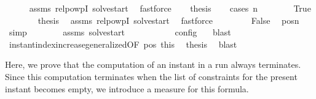 \begin{isabellebody}
\ \ \ \ \isamarkupfalse%
\ assms\ relpowp{\isacharunderscore}{}{\isacharunderscore}I\ solve{\isacharunderscore}start\ \isamarkupfalse%
\ fastforce\isanewline
\ \ \isamarkupfalse%
\ {\isacharquery}thesis\isanewline
\ \ \isamarkupfalse%
\ {\isacharparenleft}cases\ {\isacartoucheopen}n\ {\isacharequal}\ {}{\isacartoucheclose}{\isacharparenright}\isanewline
\ \ \ \ \isamarkupfalse%
\ True\isanewline
\ \ \ \ \ \ \isamarkupfalse%
\ {\isacharquery}thesis\ \isamarkupfalse%
\ assms\ relpowp{\isacharunderscore}{}{\isacharunderscore}I\ solve{\isacharunderscore}start\ \isamarkupfalse%
\ fastforce\isanewline
\ \ \isamarkupfalse%
\isanewline
\ \ \ \ \isamarkupfalse%
\ False\ \isamarkupfalse%
\ pos{\isacharcolon}{\isacartoucheopen}n\ {\isachargreater}\ {}{\isacartoucheclose}\ \isamarkupfalse%
\ simp\isanewline
\ \ \ \ \ \ \isamarkupfalse%
\ assms\ solve{\isacharunderscore}start\ \isamarkupfalse%
\ {\isacartoucheopen}{\isasymrho}\ {\isasymin}\ {\isasymlbrakk}\ {\isacharbrackleft}{\isacharbrackright}{\isacharcomma}\ {}\ {\isasymturnstile}\ {\isasymPsi}\ {\isasymtriangleright}\ {\isacharbrackleft}{\isacharbrackright}\ {\isasymrbrakk}\isactrlsub c\isactrlsub o\isactrlsub n\isactrlsub f\isactrlsub i\isactrlsub g\ {\isacartoucheclose}\ \isamarkupfalse%
\ blast\isanewline
\ \ \ \ \ \ \isamarkupfalse%
\ instant{\isacharunderscore}index{\isacharunderscore}increase{\isacharunderscore}generalized{\isacharbrackleft}OF\ pos\ this{\isacharbrackright}\ \isamarkupfalse%
\ {\isacharquery}thesis\ \isamarkupfalse%
\ blast\isanewline
\ \ \isamarkupfalse%
\isanewline
{}\isamarkupfalse%
%
\endisatagproof
{\isafoldproof}%
%
\isadelimproof
%
\endisadelimproof
%
\isadelimdocument
%
\endisadelimdocument
%
\isatagdocument
%
\isamarkuptrue%
%
\endisatagdocument
{\isafolddocument}%
%
\isadelimdocument
%
\endisadelimdocument
%
\begin{isamarkuptext}%
Here, we prove that the computation of an instant in a run always terminates.
  Since this computation terminates when the list of constraints for the present
  instant becomes empty, we introduce a measure for this formula.%
\end{isamarkuptext}\isamarkuptrue%

\end{isabellebody}
